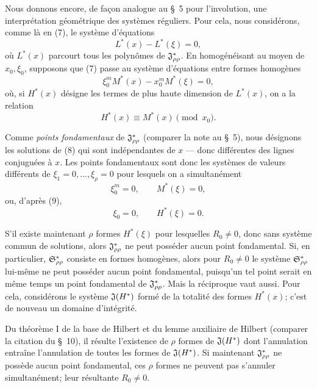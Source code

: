 Nous donnons encore, de façon analogue au \S\ 5 pour l'involution, une interprétation géométrique des systèmes réguliers. Pour cela, nous considérons, comme là en (7), le système d'équations
\begin{equation}
  L^*(x)-L^*(\xi)=0,
\tag{7}
\end{equation}
où $L^*(x)$ parcourt tous les polynômes de $\mathfrak{J}^*_{\rho\rho}$. En homogénéisant au moyen de $x_0,\xi_0$, supposons que (7) passe au système d'équations entre formes homogènes
\begin{equation}
  \xi_0^{m}M^*(x)-x_0^{m}M^*(\xi)=0,
\tag{8}
\end{equation}
où, si $H^*(x)$ désigne les termes de plus haute dimension de $L^*(x)$, on a la relation
\begin{equation}
  H^*(x)\equiv M^*(x)\pmod{x_0}.
\tag{9}
\end{equation}

Comme \emph{points fondamentaux} de $\mathfrak{J}^*_{\rho\rho}$ (comparer la note au \S\ 5), nous désignons les solutions de (8) qui sont indépendantes de $x$ --- donc différentes des lignes conjuguées à $x$. Les points fondamentaux sont donc les systèmes de valeurs différents de $\xi_1=0,\ldots,\xi_\rho=0$ pour lesquels on a simultanément
\[
  \xi_0^m=0,
  \qquad M^*(\xi)=0,
\]
ou, d'après (9),
\[
  \xi_0=0,
  \qquad H^*(\xi)=0.
\]

S'il existe maintenant $\rho$ formes $H^*(\xi)$ pour lesquelles $R_0\ne0$, donc sans système commun de solutions, alors $\mathfrak{J}^*_{\rho\rho}$ ne peut posséder aucun point fondamental. Si, en particulier, $\mathfrak{S}^*_{\rho\rho}$ consiste en formes homogènes, alors pour $R_0\ne0$ le système $\mathfrak{S}^*_{\rho\rho}$ lui-même ne peut posséder aucun point fondamental, puisqu'un tel point serait en même temps un point fondamental de $\mathfrak{J}^*_{\rho\rho}$. Mais la réciproque vaut aussi. Pour cela, considérons le système $\mathfrak{J}(H^*)$ formé de la totalité des formes $H^*(x)$; c'est de nouveau un domaine d’intégrité.

Du théorème I de la base de Hilbert et du lemme auxiliaire de Hilbert (comparer la citation du \S\ 10), il résulte l'existence de $\rho$ formes de $\mathfrak{J}(H^*)$ dont l'annulation entraîne l'annulation de toutes les formes de $\mathfrak{J}(H^*)$. Si maintenant $\mathfrak{J}^*_{\rho\rho}$ ne possède aucun point fondamental, ces $\rho$ formes ne peuvent pas s'annuler simultanément; leur résultante $R_0\ne0$.


